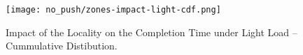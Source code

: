 \begin{figure}[h]
  \centering
  \centerline{\texttt{[image: no\_push/zones-impact-light-cdf.png]}}
  \caption{Impact of the Locality on the Completion Time under Light Load – Cummulative Distibution.}
  \label{fig:zones-impact-light-cdf}
\end{figure}
